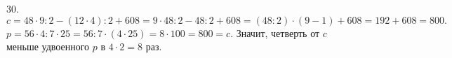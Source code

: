 30. $c=48\cdot9:2-(12\cdot4):2+608=9\cdot48:2-48:2+608=(48:2)\cdot(9-1)+608=192+608=800.$\\
$p=56\cdot4:7\cdot25=56:7\cdot(4\cdot25)=8\cdot100=800=c.$ Значит, четверть от $c$ меньше удвоенного $p$ в $4\cdot2=8$ раз.\\
